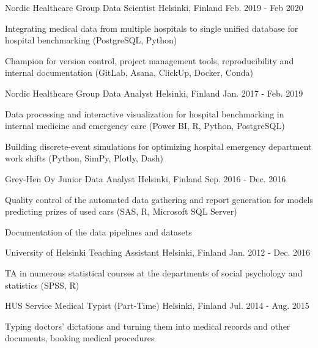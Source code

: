 \begin{cventries}
  \cventry
    {Nordic Healthcare Group} %
    {Data Scientist} %
    {Helsinki, Finland} %
    {Feb. 2019 - Feb 2020} %
    {
      \begin{cvitems}
        \item {Integrating medical data from multiple hospitals to single unified database for hospital benchmarking
        (PostgreSQL, Python)}
        \item {Champion for version control, project management tools,
        reproducibility and internal documentation (GitLab, Asana, ClickUp, Docker, Conda)}
      \end{cvitems}
    }

  \cventry
    {Nordic Healthcare Group} %
    {Data Analyst} %
    {Helsinki, Finland} %
    {Jan. 2017 - Feb. 2019} %
    {
      \begin{cvitems}
        \item {Data processing and interactive visualization for hospital benchmarking
        in internal medicine and emergency care (Power BI, R, Python, PostgreSQL)}
        \item {Building discrete-event simulations for optimizing hospital emergency department work shifts (Python, SimPy, Plotly, Dash)}
      \end{cvitems}
    }

  \cventry
    {Grey-Hen Oy} %
    {Junior Data Analyst} %
    {Helsinki, Finland} %
    {Sep. 2016 - Dec. 2016} %
    {
      \begin{cvitems}
        \item {Quality control of the automated data gathering and report generation
        for models predicting prizes of used cars (SAS, R, Microsoft SQL Server)}
        \item {Documentation of the data pipelines and datasets}
      \end{cvitems}
    }

  \cventry
    {University of Helsinki} %
    {Teaching Assistant} %
    {Helsinki, Finland} %
    {Jan. 2012 - Dec. 2016} %
    {
      \begin{cvitems}
        \item {TA in numerous statistical courses at the departments of social
        psychology and statistics (SPSS, R)}
      \end{cvitems}
    }

  \cventry
    {HUS Service} %
    {Medical Typist (Part-Time)} %
    {Helsinki, Finland} %
    {Jul. 2014 - Aug. 2015} %
    {
      \begin{cvitems}
        \item {Typing doctors' dictations and turning them into medical records and
        other documents, booking medical procedures}
      \end{cvitems}
    }


\end{cventries}
